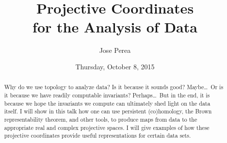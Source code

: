 \documentclass{UAmathtalk}
\author{Jose Perea}
\title{Projective Coordinates\\ for the Analysis of Data}
\date{Thursday, October 8, 2015}
\begin{document}
\maketitle

\begin{abstract}
Why do we use topology to analyze data? Is it because it sounds good? Maybe\ldots\ Or is it because we have readily computable invariants? Perhaps\ldots\ But in the end, it is because we hope the invariants we compute can ultimately shed light on  the data itself. I will show in this talk how one can use persistent (co)homology, the Brown representability theorem, and other tools, to produce maps from data to the appropriate real and complex projective spaces. I will give examples of how these projective coordinates provide useful representations for certain data sets.
\end{abstract}
\end{document}
